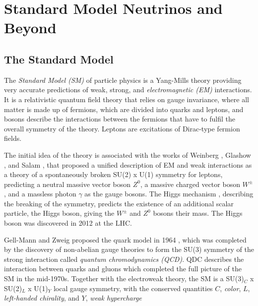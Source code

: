 \setchapterpreamble[u]{\margintoc}

\chapter{Standard Model Neutrinos and Beyond}


\section{The Standard Model}

The \textit{Standard Model (SM)} of particle physics is a Yang-Mills theory  providing very accurate predictions of weak, strong, and \textit{electromagnetic (EM)} interactions. It is a relativistic quantum field theory that relies on gauge invariance, where all matter is made up of fermions, which are divided into quarks and leptons, and bosons describe the interactions between the fermions that have to fulfil the overall symmetry of the theory. Leptons are excitations of Dirac-type fermion fields.

The initial idea of the theory is associated with the works of Weinberg , Glashow , and Salam \cite{Salam}, that proposed a unified description of EM and weak interactions as a theory of a spontaneously broken SU(2) x U(1) symmetry for leptons, predicting a neutral massive vector boson $Z^0$, a massive charged vector boson $W^\pm$, and a massless photon $\gamma$ as the gauge bosons. The Higgs mechanism , describing the breaking of the symmetry, predicts the existence of an additional scalar particle, the Higgs boson, giving the $W^\pm$ and $Z^0$ bosons their mass. The Higgs boson was discovered in 2012 at the LHC.

Gell-Mann and Zweig proposed the quark model in 1964 , which was completed by the discovery of non-abelian gauge theories \cite{non_abel_gauge} to form the SU(3) symmetry of the strong interaction called \textit{quantum chromodynamics (QCD)}. QDC describes the interaction between quarks and gluons which completed the full picture of the SM in the mid-1970s. Together with the electroweak theory, the SM is a SU(3)$_C$ x SU(2)$_L$ x U(1)$_Y$ local gauge symmetry, with the conserved quantities $C$, \textit{color}, $L$, \textit{left-handed chirality}, and $Y$, \textit{weak hypercharge}

